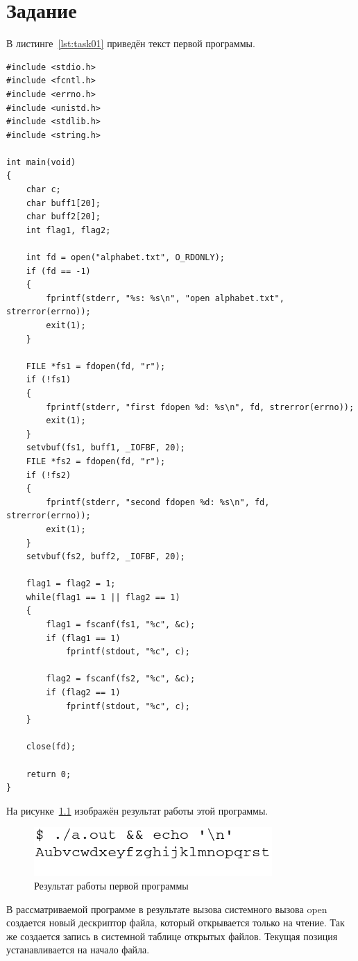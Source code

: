 \chapter{Задание }

В листинге~\ref{lst:task01} приведён текст первой программы.

\begin{lstlisting}[label=lst:task01,caption={Текст первой программы}]
#include <stdio.h>
#include <fcntl.h>
#include <errno.h>
#include <unistd.h>
#include <stdlib.h>
#include <string.h>

int main(void)
{
    char c;
    char buff1[20];
    char buff2[20];
    int flag1, flag2;

    int fd = open("alphabet.txt", O_RDONLY);
    if (fd == -1)
    {
        fprintf(stderr, "%s: %s\n", "open alphabet.txt", strerror(errno));
        exit(1);
    }

    FILE *fs1 = fdopen(fd, "r");
    if (!fs1)
    {
        fprintf(stderr, "first fdopen %d: %s\n", fd, strerror(errno));
        exit(1);
    }
    setvbuf(fs1, buff1, _IOFBF, 20);
    FILE *fs2 = fdopen(fd, "r");
    if (!fs2)
    {
        fprintf(stderr, "second fdopen %d: %s\n", fd, strerror(errno));
        exit(1);
    }
    setvbuf(fs2, buff2, _IOFBF, 20);

    flag1 = flag2 = 1;
    while(flag1 == 1 || flag2 == 1)
    {
        flag1 = fscanf(fs1, "%c", &c);
        if (flag1 == 1)
            fprintf(stdout, "%c", c);

        flag2 = fscanf(fs2, "%c", &c);
        if (flag2 == 1)
            fprintf(stdout, "%c", c);
    }

    close(fd);

    return 0;
}

\end{lstlisting}

На рисунке~\ref{img:task01} изображён результат работы этой программы.

\begin{figure}[H]
    \includegraphics[scale=0.5]{images/task01}
    \caption{Результат работы первой программы}\label{img:task01}
\end{figure}

В рассматриваемой программе в результате вызова системного вызова open создается новый дескриптор файла, который открывается только на чтение. Так же создается запись в системной таблице открытых файлов. Текущая позиция устанавливается на начало файла.

